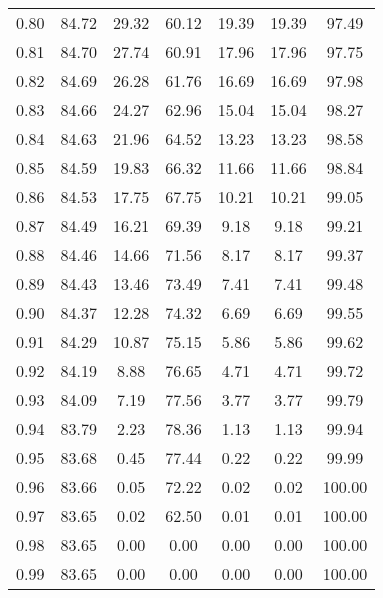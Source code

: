 \begin{tabular}{|c|c|c|c|c|c|c|}
      0.80 &     84.72 &     29.32 &      60.12 &   19.39 &      19.39 &         97.49 \\
      0.81 &     84.70 &     27.74 &      60.91 &   17.96 &      17.96 &         97.75 \\
      0.82 &     84.69 &     26.28 &      61.76 &   16.69 &      16.69 &         97.98 \\
      0.83 &     84.66 &     24.27 &      62.96 &   15.04 &      15.04 &         98.27 \\
      0.84 &     84.63 &     21.96 &      64.52 &   13.23 &      13.23 &         98.58 \\
      0.85 &     84.59 &     19.83 &      66.32 &   11.66 &      11.66 &         98.84 \\
      0.86 &     84.53 &     17.75 &      67.75 &   10.21 &      10.21 &         99.05 \\
      0.87 &     84.49 &     16.21 &      69.39 &    9.18 &       9.18 &         99.21 \\
      0.88 &     84.46 &     14.66 &      71.56 &    8.17 &       8.17 &         99.37 \\
      0.89 &     84.43 &     13.46 &      73.49 &    7.41 &       7.41 &         99.48 \\
      0.90 &     84.37 &     12.28 &      74.32 &    6.69 &       6.69 &         99.55 \\
      0.91 &     84.29 &     10.87 &      75.15 &    5.86 &       5.86 &         99.62 \\
      0.92 &     84.19 &      8.88 &      76.65 &    4.71 &       4.71 &         99.72 \\
      0.93 &     84.09 &      7.19 &      77.56 &    3.77 &       3.77 &         99.79 \\
      0.94 &     83.79 &      2.23 &      78.36 &    1.13 &       1.13 &         99.94 \\
      0.95 &     83.68 &      0.45 &      77.44 &    0.22 &       0.22 &         99.99 \\
      0.96 &     83.66 &      0.05 &      72.22 &    0.02 &       0.02 &        100.00 \\
      0.97 &     83.65 &      0.02 &      62.50 &    0.01 &       0.01 &        100.00 \\
      0.98 &     83.65 &      0.00 &       0.00 &    0.00 &       0.00 &        100.00 \\
      0.99 &     83.65 &      0.00 &       0.00 &    0.00 &       0.00 &        100.00 \\
\bottomrule
\end{tabular}
